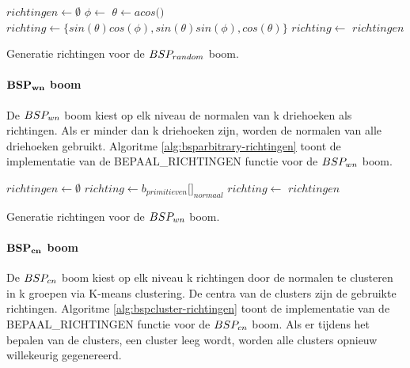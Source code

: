 \begin{dutchalgorithm}
    \begin{algorithmic}       
            \State $richtingen \gets \emptyset$
                    \State $\phi \gets $ 
                    \State $\theta \gets acos($$)$
                    \State $richting \gets \{ sin(\theta)cos(\phi), sin(\theta)sin(\phi), cos(\theta) \}$
                    \State $richting \gets $ 
                    \State {}
            \EndFor
            \State \Return $richtingen$
        \EndFunction
    \end{algorithmic}
    \caption{Generatie richtingen voor de $BSP_{random}$  boom.}
    \label{alg:bsprandom-richtingen}
\end{dutchalgorithm}

\paragraph{$\mathbf{BSP_{wn}}$ boom}
De $BSP_{wn}$ boom kiest op elk niveau de normalen van k driehoeken als richtingen.
Als er minder dan k driehoeken zijn, worden de normalen van alle driehoeken gebruikt.
Algoritme \ref{alg:bsparbitrary-richtingen} toont de implementatie van de BEPAAL\_RICHTINGEN functie voor de $BSP_{wn}$ boom.

\begin{dutchalgorithm}
    \begin{algorithmic}       
            \State $richtingen \gets \emptyset$
                    \State $richting \gets b_{primitieven}[$$]_{normaal}$
                    \State $richting \gets $ 
                    \State {}
            \EndWhile
            \State \Return $richtingen$
        \EndFunction
    \end{algorithmic}
    \caption{Generatie richtingen voor de $BSP_{wn}$  boom.}
    \label{alg:bsparbitrary-richtingen}
\end{dutchalgorithm}

\paragraph{$\mathbf{BSP_{cn}}$ boom}
De $BSP_{cn}$ boom kiest op elk niveau k richtingen door de normalen te clusteren in k groepen via K-means clustering.
De centra van de clusters zijn de gebruikte richtingen.
Algoritme \ref{alg:bspcluster-richtingen} toont de implementatie van de BEPAAL\_RICHTINGEN functie voor de $BSP_{cn}$ boom.
Als er tijdens het bepalen van de clusters, een cluster leeg wordt, worden alle clusters opnieuw willekeurig gegenereerd.


